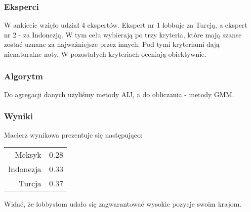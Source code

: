 \documentclass[12pt, a4paper]{article}
\begin{document}
    \subsubsection*{Eksperci}
    W ankiecie wzięło udział 4 ekspertów. Ekspert nr 1 lobbuje za Turcją, a ekspert nr 2 - za Indonezją.
    W tym celu wybierają po trzy kryteria, które mają szanse zostać uznane za najważniejsze przez innych.
    Pod tymi kryteriami dają nienaturalne noty. W pozostałych kryteriach oceniają obiektywnie.

    \subsubsection*{Algorytm}
    Do agregacji danych użyliśmy metody AIJ, a do obliczania - metody GMM.

    \subsubsection*{Wyniki}
    Macierz wynikowa prezentuje się następująco:
    \begin{table}[h]
        \centering
        \begin{tabular}{rl}
            Meksyk & 0.28 \\ 
            Indonezja & 0.33 \\
            Turcja & 0.37
        \end{tabular}
    \end{table}

    Widać, że lobbystom udało się zagwarantować wysokie pozycje swoim krajom.
\end{document}
